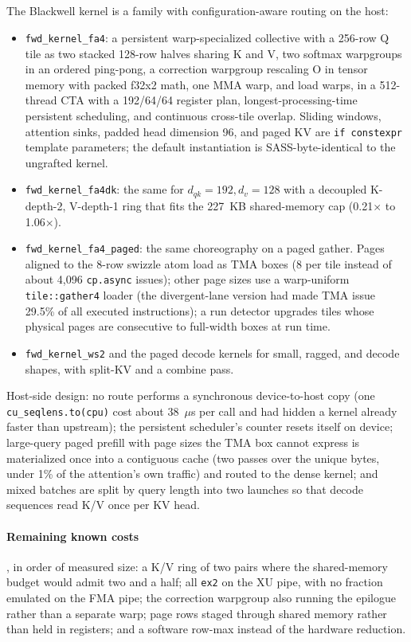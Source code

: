 \subsection{\fafour}
The Blackwell kernel is a family with configuration-aware routing on the host:
\begin{itemize}
\item \texttt{fwd\_kernel\_fa4}: a persistent warp-specialized collective
with a 256-row Q tile as two stacked 128-row halves sharing K and V, two
softmax warpgroups in an ordered ping-pong, a correction warpgroup rescaling O in tensor memory with
packed f32x2 math, one MMA warp, and load warps, in a 512-thread CTA with a 192/64/64 register plan,
longest-processing-time persistent scheduling, and continuous cross-tile overlap. Sliding windows,
attention sinks, padded head dimension 96, and paged KV are \texttt{if constexpr} template
parameters; the default instantiation is SASS-byte-identical to the ungrafted kernel.
\item \texttt{fwd\_kernel\_fa4dk}: the same for $d_{qk}=192, d_v=128$ with a decoupled K-depth-2,
V-depth-1 ring that fits the 227~KB shared-memory cap (0.21$\times$ to 1.06$\times$).
\item \texttt{fwd\_kernel\_fa4\_paged}: the same choreography on a paged gather. Pages aligned to
the 8-row swizzle atom load as TMA boxes (8 per tile instead of about 4,096 \texttt{cp.async}
issues); other page sizes use a warp-uniform \texttt{tile::gather4} loader (the divergent-lane
version had made TMA issue 29.5\% of all executed instructions); a run detector upgrades tiles whose
physical pages are consecutive to full-width boxes at run time.
\item \texttt{fwd\_kernel\_ws2} and the paged decode kernels for small, ragged, and decode shapes,
with split-KV and a combine pass.
\end{itemize}
Host-side design: no route performs a synchronous device-to-host copy (one
\texttt{cu\_seqlens.to(cpu)} cost about 38~$\mu$s per call and had hidden a kernel already faster
than upstream); the persistent scheduler's counter resets itself on device; large-query paged prefill
with page sizes the TMA box cannot express is materialized once into a contiguous cache (two passes
over the unique bytes, under 1\% of the attention's own traffic) and routed to the dense kernel; and
mixed batches are split by query length into two launches so that decode sequences read K/V once per
KV head.

\paragraph{Remaining known costs}, in order of measured size: a K/V ring of two pairs where the
shared-memory budget would admit two and a half; all \texttt{ex2} on the XU pipe, with no fraction
emulated on the FMA pipe; the correction warpgroup also running the epilogue rather than a separate
warp; page rows staged through shared memory rather than held in registers; and a software row-max
instead of the hardware reduction.

